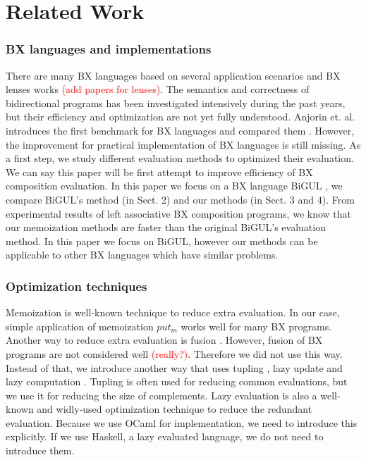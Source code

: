 \section{Related Work}

\subsubsection*{BX languages and implementations}

There are many BX languages \cite{josh_pepm} \cite{BXtend} \cite{eMoflon} \cite{EVL+Strace} \cite{JTL} \cite{NMF}
based on several application scenarios and BX lenses works \cite{} \textcolor{red}{(add papers for lenses)}. The semantics and correctness of bidirectional programs has been investigated intensively during the past years, but their efficiency and optimization are not yet fully understood. Anjorin et. al. introduces the first benchmark for BX languages and compared them \cite{BXcomp}. However, the improvement for practical implementation of BX languages is still missing. As a first step, we study different evaluation methods to optimized their evaluation. We can say this paper will be first attempt to improve efficiency of BX composition evaluation. In this paper we focus on a BX language BiGUL \cite{josh_pepm} \cite{josh_popl}, we compare BiGUL's method (in Sect. 2) and our methods (in Sect. 3 and 4). From experimental results of left associative BX composition programs, we know that our memoization methods are faster than the original BiGUL's evaluation method.
In this paper we focus on BiGUL, however our methods can be applicable to other BX languages which have similar problems.


\subsubsection*{Optimization techniques}

Memoization \cite{} is well-known technique to reduce extra evaluation. In our case, simple application of memoization $put_m$ works well for many BX programs.
Another way to reduce extra evaluation is fusion \cite{}. However, fusion of BX programs are not considered well \textcolor{red}{(really?)}. Therefore we did not use this way.
  Instead of that, we introduce another way that uses tupling \cite{tupling}, lazy update and lazy computation \cite{}. Tupling is often used for reducing common evaluations, but we use it for reducing the size of complements.
  Lazy evaluation is also a well-known and widly-used optimization technique to reduce the redundant evaluation. Because we use OCaml for implementation, we need to introduce this explicitly. If we use Haskell, a lazy evaluated language, we do not need to introduce them.


